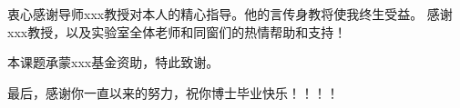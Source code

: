 
衷心感谢导师xxx教授对本人的精心指导。他的言传身教将使我终生受益。
感谢xxx教授，以及实验室全体老师和同窗们的热情帮助和支持！

本课题承蒙xxx基金资助，特此致谢。

最后，感谢你一直以来的努力，祝你博士毕业快乐！！！！